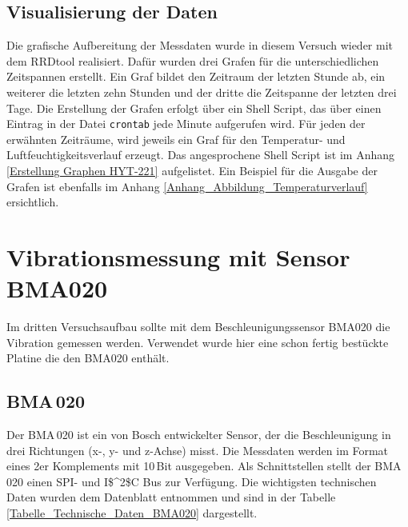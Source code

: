 \subsection{Visualisierung der Daten}
\label{subsection_Visualisierung der Daten_HYT221}
Die grafische Aufbereitung der Messdaten wurde in diesem Versuch wieder mit dem RRDtool realisiert. Dafür wurden drei Grafen für die unterschiedlichen Zeitspannen erstellt. Ein Graf bildet den Zeitraum der letzten Stunde ab, ein weiterer die letzten zehn Stunden und der dritte die Zeitspanne der letzten drei Tage. Die Erstellung der Grafen erfolgt über ein Shell Script, das über einen Eintrag in der Datei \texttt{crontab} jede Minute aufgerufen wird. Für jeden der erwähnten Zeiträume, wird jeweils ein Graf für den Temperatur- und Luftfeuchtigkeitsverlauf erzeugt. Das angesprochene Shell Script ist im Anhang \ref{Erstellung Graphen HYT-221} aufgelistet. Ein Beispiel für die Ausgabe der Grafen ist ebenfalls im Anhang \ref{Anhang_Abbildung_Temperaturverlauf} ersichtlich. \newpage


\section{Vibrationsmessung mit Sensor BMA020}
\label{section_BMA020}
Im dritten Versuchsaufbau sollte mit dem Beschleunigungssensor BMA020 die Vibration gemessen werden. Verwendet wurde hier eine schon fertig bestückte Platine die den BMA020 enthält.

\subsection{BMA\,020}
\label{subsection_BMA020}
Der BMA\,020 ist ein von Bosch entwickelter Sensor, der die Beschleunigung in drei Richtungen (x-, y- und z-Achse) misst. Die Messdaten werden im Format eines 2er Komplements mit 10\,Bit ausgegeben. Als Schnittstellen stellt der BMA\,020 einen SPI- und \ac{I$^2$C} Bus zur Verfügung. Die wichtigsten technischen Daten wurden dem Datenblatt \citep{Datenblatt_BMA020} entnommen und sind in der Tabelle \ref{Tabelle_Technische_Daten_BMA020} dargestellt.  

